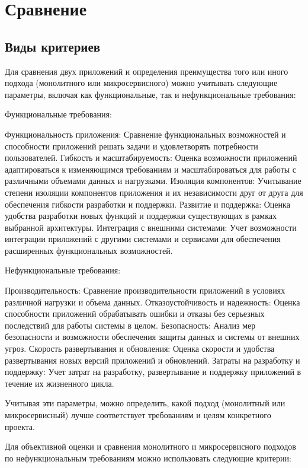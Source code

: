 \section{Сравнение}

\subsection{Виды критериев}

Для сравнения двух приложений и определения преимущества того или иного подхода (монолитного или микросервисного) можно учитывать следующие параметры, включая как функциональные, так и нефункциональные требования:

Функциональные требования:

    Функциональность приложения: Сравнение функциональных возможностей и способности приложений решать задачи и удовлетворять потребности пользователей.
    Гибкость и масштабируемость: Оценка возможности приложений адаптироваться к изменяющимся требованиям и масштабироваться для работы с различными объемами данных и нагрузками.
    Изоляция компонентов: Учитывание степени изоляции компонентов приложения и их независимости друг от друга для обеспечения гибкости разработки и поддержки.
    Развитие и поддержка: Оценка удобства разработки новых функций и поддержки существующих в рамках выбранной архитектуры.
    Интеграция с внешними системами: Учет возможности интеграции приложений с другими системами и сервисами для обеспечения расширенных функциональных возможностей.

Нефункциональные требования:

    Производительность: Сравнение производительности приложений в условиях различной нагрузки и объема данных.
    Отказоустойчивость и надежность: Оценка способности приложений обрабатывать ошибки и отказы без серьезных последствий для работы системы в целом.
    Безопасность: Анализ мер безопасности и возможности обеспечения защиты данных и системы от внешних угроз.
    Скорость развертывания и обновления: Оценка скорости и удобства развертывания новых версий приложений и обновлений.
    Затраты на разработку и поддержку: Учет затрат на разработку, развертывание и поддержку приложений в течение их жизненного цикла.

Учитывая эти параметры, можно определить, какой подход (монолитный или микросервисный) лучше соответствует требованиям и целям конкретного проекта.

Для объективной оценки и сравнения монолитного и микросервисного подходов по нефункциональным требованиям можно использовать следующие критерии:


